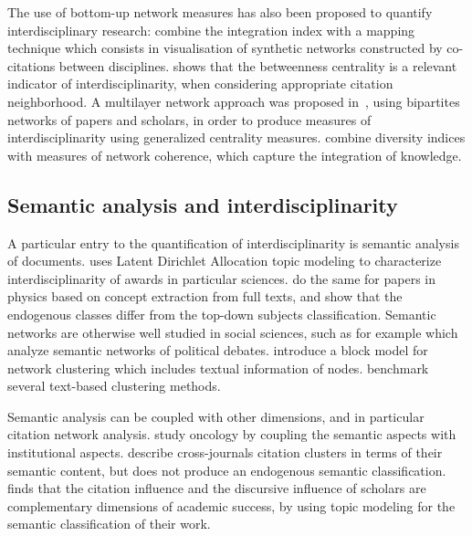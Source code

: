 \documentclass[10pt]{article}
\begin{document}
The use of bottom-up network measures has also been proposed to quantify interdisciplinary research: \cite{porter2009science} combine the integration index with a mapping technique which consists in visualisation of synthetic networks constructed by co-citations between disciplines. \cite{leydesdorff2007betweenness} shows that the betweenness centrality is a relevant indicator of interdisciplinarity, when considering appropriate citation neighborhood. A multilayer network approach was proposed in~\cite{omodei2017evaluating}, using bipartites networks of papers and scholars, in order to produce measures of interdisciplinarity using generalized centrality measures. \cite{rafols2009diversity} combine diversity indices with measures of network coherence, which capture the integration of knowledge.


\subsection*{Semantic analysis and interdisciplinarity}

A particular entry to the quantification of interdisciplinarity is semantic analysis of documents. \cite{nichols2014topic} uses Latent Dirichlet Allocation topic modeling to characterize interdisciplinarity of awards in particular sciences. \cite{palchykov2016ground} do the same for papers in physics based on concept extraction from full texts, and show that the endogenous classes differ from the top-down subjects classification. Semantic networks are otherwise well studied in social sciences, such as for example \cite{2015arXiv151003797G} which analyze semantic networks of political debates. \cite{bouveyron2016stochastic} introduce a block model for network clustering which includes textual information of nodes. \cite{10.1371/journal.pone.0018029} benchmark several text-based clustering methods.

Semantic analysis can be coupled with other dimensions, and in particular citation network analysis. \cite{bras2017oncology} study oncology by coupling the semantic aspects with institutional aspects. \cite{zhang2010journal} describe cross-journals citation clusters in terms of their semantic content, but does not produce an endogenous semantic classification. \cite{gerow2018measuring} finds that the citation influence and the discursive influence of scholars are complementary dimensions of academic success, by using topic modeling for the semantic classification of their work.
\end{document}
